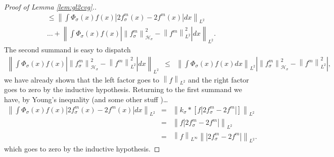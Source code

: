 \documentclass{article} %
\def\hsig{{\mathcal{H}_\sigma}}
\def\ksig{{k_\sigma}}
\def\fm{{\Phi_\sigma}} %
\def\grkdem{{f_{\sigma}^m}}
\def\rfm{{f^m}}
\def\l{\left}
\def\r{\right}
\theoremstyle{definition}
\begin{document}
\begin{proof}[Proof of Lemma \ref{lem:gl2cvg}.]
\begin{eqnarray*}
		\le \l\|\int \fm\left( x \right)f(x)  \l| 2\grkdem\left( x \right) - 2\rfm\left( x \right)   \r| dx \r\|_{L^2}\\
		\ldots + \l\|\int \fm\left( x \right)f(x)\l| \l\| \grkdem \r\|_{\hsig}^2 - \l\| \rfm \r\|_{L^2}^2\r|dx \r\|_{L^2}.
	\end{eqnarray*}
	The second summand is easy to dispatch
	\begin{eqnarray*}
		\l\|\int \fm\left( x \right)f(x)\l| \l\| \grkdem \r\|_{\hsig}^2 - \l\| \rfm \r\|_{L^2}^2\r|dx \r\|_{L^2}
		&\le& \l\|\int \fm\left( x \right)f(x)dx \r\|_{L^2}\l| \l\| \grkdem \r\|_{\hsig}^2 - \l\| \rfm \r\|_{L^2}^2\r|,
	\end{eqnarray*}
	we have already shown that the left factor goes to $\l\|f\r\|_{L^2}$ and the right factor goes to zero by the inductive hypothesis.
	Returning to the first summand we have, by Young's inequality (and some other stuff )\dots
	\begin{eqnarray*}
		\l\|\int \fm\left( x \right)f(x)  \l| 2\grkdem\left( x \right) - 2\rfm\left( x \right)   \r| dx \r\|_{L^2}
		&=& \l\| \ksig \ast \l[f  \l| 2\grkdem - 2\rfm   \r| \r] \r\|_{L^2}\\
		&=& \l\| f  \l| 2\grkdem - 2\rfm   \r| \r\|_{L^2}\\
		&=& \l\|f\r\|_{L^\infty}\l\| \l| 2\grkdem - 2\rfm   \r| \r\|_{L^2}.
	\end{eqnarray*}
	which goes to zero by the inductive hypothesis.


\end{proof}
\end{document}
